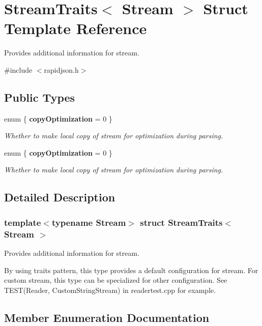 \hypertarget{structStreamTraits}{}\section{Stream\+Traits$<$ Stream $>$ Struct Template Reference}
\label{structStreamTraits}


Provides additional information for stream.  




{\ttfamily \#include $<$rapidjson.\+h$>$}

\subsection*{Public Types}
\begin{DoxyCompactItemize}
\item 
enum \{ {\bfseries copy\+Optimization} = 0
 \}\begin{DoxyCompactList}\small\item\em Whether to make local copy of stream for optimization during parsing. \end{DoxyCompactList}
\item 
enum \{ {\bfseries copy\+Optimization} = 0
 \}\begin{DoxyCompactList}\small\item\em Whether to make local copy of stream for optimization during parsing. \end{DoxyCompactList}
\end{DoxyCompactItemize}


\subsection{Detailed Description}
\subsubsection*{template$<$typename Stream$>$\newline
struct Stream\+Traits$<$ Stream $>$}

Provides additional information for stream. 

By using traits pattern, this type provides a default configuration for stream. For custom stream, this type can be specialized for other configuration. See T\+E\+S\+T(\+Reader, Custom\+String\+Stream) in readertest.\+cpp for example. 

\subsection{Member Enumeration Documentation}
\mbox{\label{structStreamTraits_a64a94d34469e994376c206d9b33406e3}} 
